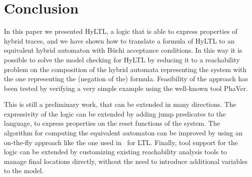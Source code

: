 \documentclass[submission,copyright,creativecommons]{eptcs}
\newcommand{\hyltl}{\textsf{HyLTL}\xspace}
\newcommand{\ltl}{\textsf{LTL}\xspace}
\begin{document}
\section{Conclusion}

In this paper we presented \hyltl, a logic that is able to express properties of hybrid traces, and we have shown how to translate a formula of \hyltl to an equivalent hybrid automaton with B\"uchi acceptance conditions.
In this way it is possible to solve the model checking for \hyltl by reducing it to a reachability problem on the composition of the hybrid automata representing the system with the one representing the (negation of the) formula.
Feasibility of the approach has been tested by verifying a very simple example using the well-known tool PhaVer.

This is still a preliminary work, that can be extended in many directions. The expressivity of the logic can be extended by adding jump predicates to the language, to express properties on the reset functions of the system. 
The algorithm for computing the equivalent automaton can be improved by using an on-the-fly approach like the one used in~\cite{Gerth95} for \ltl. Finally, tool support for the logic can be extended by customizing existing reachability analysis tools to manage final locations directly, without the need to introduce additional variables to the model.



\end{document}
